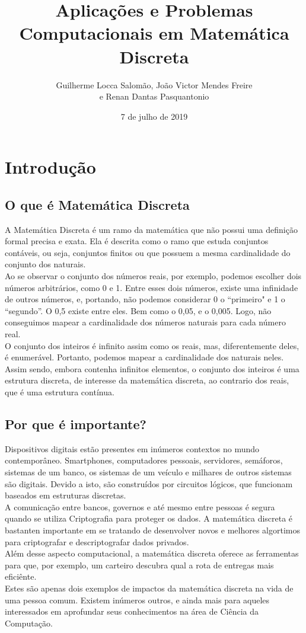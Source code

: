 \documentclass{article}
\title{Aplicações e Problemas Computacionais em Matemática Discreta}
\author{Guilherme Locca Salomão, João Victor Mendes Freire \\e Renan Dantas Pasquantonio }
\date{7 de julho de 2019}
\begin{document}
\maketitle

\section{Introdução}
    \subsection{O que é Matemática Discreta}
    
    A Matemática Discreta é um ramo da matemática que não possui uma definição formal precisa e exata. Ela é descrita como o ramo que estuda conjuntos contáveis, ou seja, conjuntos finitos ou que possuem a mesma cardinalidade do conjunto dos naturais.\\
    Ao se observar o conjunto dos números reais, por exemplo, podemos escolher dois números arbitrários, como 0 e 1. Entre esses dois números, existe uma infinidade de outros números, e, portando, não podemos considerar 0 o “primeiro" e 1 o “segundo”. O 0,5 existe entre eles. Bem como o 0,05, e o 0,005. Logo, não conseguimos mapear a cardinalidade dos números naturais para cada número real.\\
    O conjunto dos inteiros é infinito assim como os reais, mas, diferentemente deles, é enumerável. Portanto, podemos mapear a cardinalidade dos naturais neles. \\
    Assim sendo, embora contenha infinitos elementos, o conjunto dos inteiros é uma estrutura discreta, de interesse da matemática discreta, ao contrario dos reais, que é uma estrutura contínua.
    
    
    \subsection{Por que é importante?}
    Dispositivos digitais estão presentes em inúmeros contextos no mundo contemporâneo. Smartphones, computadores pessoais, servidores, semáforos, sistemas de um banco, os sistemas de um veículo e milhares de outros sistemas são digitais. Devido a isto, são construídos por circuitos lógicos, que funcionam baseados em estruturas discretas.\\
    A comunicação entre bancos, governos e até mesmo entre pessoas é segura quando se utiliza Criptografia para proteger os dados. A matemática discreta é bastanten importante em se tratando de desenvolver novos e melhores algortimos para criptografar e descriptografar dados privados.\\
    Além desse aspecto computacional, a matemática discreta oferece as ferramentas para que, por exemplo, um carteiro descubra qual a rota de entregas mais eficiênte.\\
    Estes são apenas dois exemplos de impactos da matemática discreta na vida de uma pessoa comum. Existem inúmeros outros, e ainda mais para aqueles interessados em aprofundar seus conhecimentos na área de Ciência da Computação.\\
    
\end{document}
